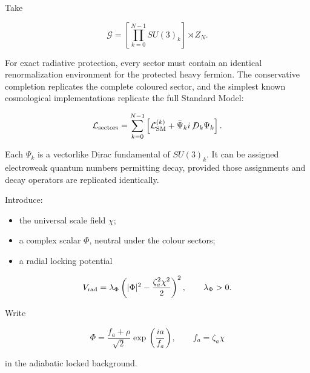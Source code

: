 \documentclass[11pt,a4paper]{article}
\providecommand{\tightlist}{\setlength{\itemsep}{0pt}\setlength{\parskip}{0pt}}
\begin{document}
Take

\[
\mathcal G
=
\left[\prod_{k=0}^{N-1}SU(3)_k\right]\rtimes Z_N.
\]

For exact radiative protection, every sector must contain an identical
renormalization environment for the protected heavy fermion. The
conservative completion replicates the complete coloured sector, and the
simplest known cosmological implementations replicate the full Standard
Model:

\[
\mathcal L_{\rm sectors}
=
\sum_{k=0}^{N-1}
\left[
\mathcal L_{\rm SM}^{(k)}
+\bar\Psi_k i\!\not\!D_k\Psi_k
\right].
\]

Each \(\Psi_k\) is a vectorlike Dirac fundamental of \(SU(3)_k\). It can
be assigned electroweak quantum numbers permitting decay, provided those
assignments and decay operators are replicated identically.

Introduce:

\begin{itemize}
\tightlist
\item
  the universal scale field \(\chi\);
\item
  a complex scalar \(\Phi\), neutral under the colour sectors;
\item
  a radial locking potential
\end{itemize}

\[
V_{\rm rad}
=
\lambda_\Phi
\left(
|\Phi|^2-\frac{\zeta_a^2\chi^2}{2}
\right)^2,
\qquad
\lambda_\Phi>0.
\]

Write

\[
\Phi
=
\frac{f_a+\rho}{\sqrt2}
\exp\left(\frac{ia}{f_a}\right),
\qquad
f_a=\zeta_a\chi
\]

in the adiabatic locked background.
\end{document}
